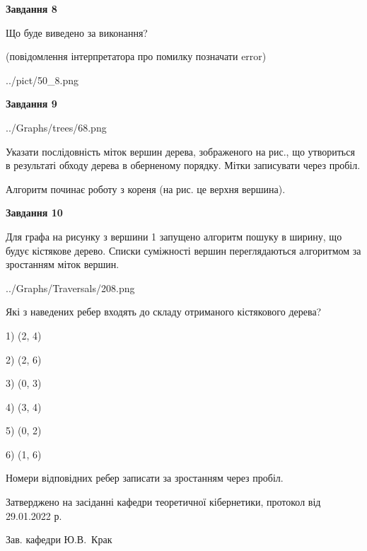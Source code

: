 \documentclass[12pt, ukrainian]{article}
\begin{document}
{\begin {large}
{\begin {center}\textbf{Завдання 8}\end {center}}\par
Що буде виведено за виконання?\par
 (повідомлення інтерпретатора про помилку позначати error)\par
\begin{center}
	{../pict/50_8.png}
\end{center}
\newpage

{\begin {center}\textbf{Завдання 9}\end {center}}\par

\begin{center}
	{../Graphs/trees/68.png}
\end{center}
Указати послідовність міток вершин дерева, зображеного на рис., що утвориться в результаті обходу дерева в оберненому порядку. Мітки записувати через пробіл.\par Алгоритм починає роботу з кореня (на рис. це верхня вершина).\par
\newpage

{\begin {center}\textbf{Завдання 10}\end {center}}\par
Для графа на рисунку з вершини 1 запущено алгоритм пошуку в ширину, що будує кістякове дерево. Списки суміжності вершин переглядаються алгоритмом за зростанням міток вершин.\par
\begin{center}
	{../Graphs/Traversals/208.png}
\end{center}
\par Які з наведених ребер входять до складу отриманого кістякового дерева?\par
1) (2, 4)\par
2) (2, 6)\par
3) (0, 3)\par
4) (3, 4)\par
5) (0, 2)\par
6) (1, 6)\par
{\vskip 15pt} Номери відповідних ребер записати за зростанням через пробіл.\par
\newpage


\end {large}
}
{\smallskip \begin {small} Затверджено на засіданні кафедри теоретичної кібернетики, протокол  від   29.01.2022 р.\par\smallskip\smallskip
{\parbox {6.5 cm}{Зав. кафедри \dotfill Ю.В.~Крак}} \end{small}}
\end{document}
